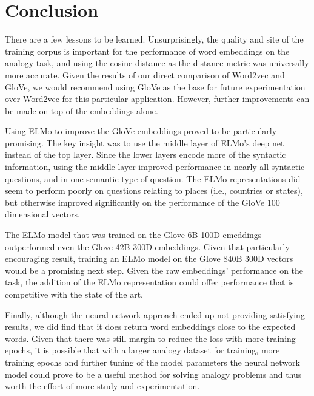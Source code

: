 \documentclass[11pt]{article}
\begin{document}
\section{Conclusion}

There are a few lessons to be learned. Unsurprisingly, the quality and
site of the training corpus is important for the performance of word
embeddings on the analogy task, and using the cosine distance as the
distance metric was universally more accurate. Given the results of our
direct comparison of Word2vec and GloVe, we would recommend using GloVe
as the base for future experimentation over Word2vec for this particular
application. However, further improvements can be made on top of the
embeddings alone.

Using ELMo to improve the GloVe embeddings proved to be particularly
promising. The key insight was to use the middle layer of ELMo's deep
net instead of the top layer. Since the lower layers encode more of the
syntactic information, using the middle layer improved performance in
nearly all syntactic questions, and in one semantic type of question.
The ELMo representations did seem to perform poorly on questions
relating to places (i.e., countries or states), but otherwise improved
significantly on the performance of the GloVe 100 dimensional vectors.

The ELMo model that was trained on the Glove 6B 100D emeddings
outperformed even the Glove 42B 300D embeddings. Given that particularly
encouraging result, training an ELMo model on the Glove 840B 300D
vectors would be a promising next step. Given the raw embeddings'
performance on the task, the addition of the ELMo representation could
offer performance that is competitive with the state of the art.

Finally, although the neural network approach ended up not providing
satisfying results, we did find that it does return word embeddings
close to the expected words. Given that there was still margin to reduce
the loss with more training epochs, it is possible that with a larger
analogy dataset for training, more training epochs and further tuning of
the model parameters the neural network model could prove to be a useful
method for solving analogy problems and thus worth the effort of more
study and experimentation.
\end{document}
